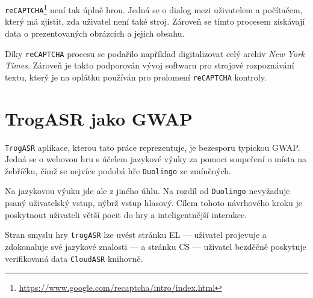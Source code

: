 \verb|reCAPTCHA|\footnote{\url{https://www.google.com/recaptcha/intro/index.html}} \cite{ahn_2008} není tak úplně hrou. Jedná se o dialog mezi uživatelem a počítačem, který má zjistit, zda uživatel není také stroj. Zároveň se tímto procesem získávají data o prezentovaných obrázcích a jejich obsahu.

Díky \verb|reCAPTCHA| procesu se podařilo například digitalizovat celý archiv {\sl New York Times}. Zároveň je takto podporován vývoj softwaru pro strojové rozpoznávání textu, který je na oplátku používán pro prolomení \verb|reCAPTCHA| kontroly.

\section{TrogASR jako GWAP}

\verb|TrogASR| aplikace, kterou tato práce reprezentuje, je bezesporu typickou GWAP. Jedná se o webovou hru s účelem jazykové výuky za pomoci soupeření o místa na žebříčku, čímž se nejvíce podobá hře \verb|Duolingo| ze zmíněných.

Na jazykovou výuku jde ale z jiného úhlu. Na rozdíl od \verb|Duolingo| nevyžaduje psaný uživatelský vstup, nýbrž vstup hlasový. Cílem tohoto návrhového kroku je poskytnout uživateli větší pocit  do hry a inteligentnější interakce.

Stran smyslu hry \verb|trogASR| lze uvést stránku EL --- uživatel projevuje a zdokonaluje své jazykové znalosti --- a stránku CS --- uživatel bezděčně poskytuje verifikovaná data \verb|CloudASR| knihovně.
